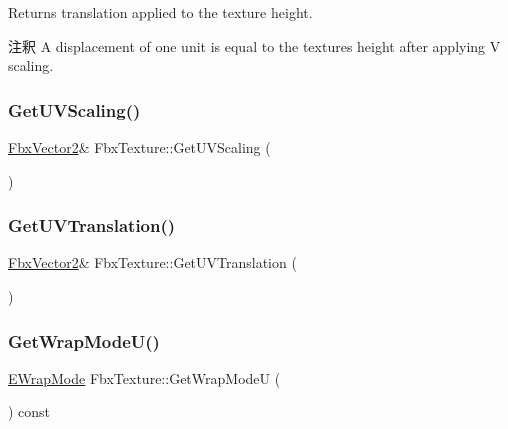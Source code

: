 Returns translation applied to the texture height. \begin{DoxyRemark}{注釈}
A displacement of one unit is equal to the texture\textquotesingle{}s height after applying V scaling. 
\end{DoxyRemark}
\mbox{\label{class_fbx_texture_a7b3d7fa85a447f0250555bb54f8d36b8}} 
\subsubsection{\texorpdfstring{Get\+U\+V\+Scaling()}{GetUVScaling()}}
{\footnotesize\ttfamily \hyperlink{class_fbx_vector2}{Fbx\+Vector2}\& Fbx\+Texture\+::\+Get\+U\+V\+Scaling (\begin{DoxyParamCaption}{ }\end{DoxyParamCaption})}

\mbox{\label{class_fbx_texture_a091e91a0be7caf96f48a8f3fb3cb08d2}} 
\subsubsection{\texorpdfstring{Get\+U\+V\+Translation()}{GetUVTranslation()}}
{\footnotesize\ttfamily \hyperlink{class_fbx_vector2}{Fbx\+Vector2}\& Fbx\+Texture\+::\+Get\+U\+V\+Translation (\begin{DoxyParamCaption}{ }\end{DoxyParamCaption})}

\mbox{\label{class_fbx_texture_a4df1c01895bf8fb995a5c031de7b77fe}} 
\subsubsection{\texorpdfstring{Get\+Wrap\+Mode\+U()}{GetWrapModeU()}}
{\footnotesize\ttfamily \hyperlink{class_fbx_texture_ae273dffe3ff532dfd57e7bdb15b121fd}{E\+Wrap\+Mode} Fbx\+Texture\+::\+Get\+Wrap\+ModeU (\begin{DoxyParamCaption}{ }\end{DoxyParamCaption}) const}

